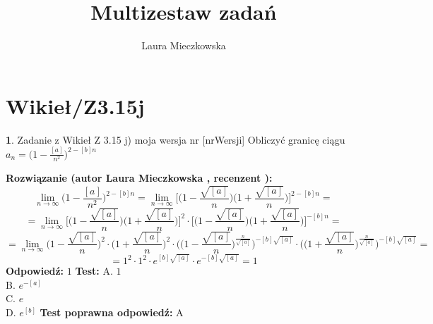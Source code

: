 \documentclass[12pt, a4paper]{article}
\title{Multizestaw zadań}
\author{Laura Mieczkowska}
\date{}
\theoremstyle{definition} %
\newtheorem{zad}{}
\newcommand{\kategoria}[1]{\section{#1}} %
\newcommand{\zadStart}[1]{\begin{zad}#1\newline} %
\newcommand{\zadStop}{\end{zad}}   %
\newcommand{\rozwStart}[2]{\noindent \textbf{Rozwiązanie (autor #1 , recenzent #2): }\newline} %
\newcommand{\odpStart}{\noindent \textbf{Odpowiedź:}\newline}    %
\newcommand{\odpStop}{\newline}                                             %
\newcommand{\testStart}{\noindent \textbf{Test:}\newline} %
\newcommand{\testStop}{\newline} %
\newcommand{\kluczStart}{\noindent \textbf{Test poprawna odpowiedź:}\newline} %
\newcommand{\kluczStop}{\newline} %
\begin{document}
\maketitle


\kategoria{Wikieł/Z3.15j}
\zadStart{Zadanie z Wikieł Z 3.15 j) moja wersja nr [nrWersji]}
Obliczyć granicę ciągu $a_n=\big(1-\frac{[a]}{n^2}\big)^{2-[b]n}$
\zadStop
\rozwStart{Laura Mieczkowska}{}
$$\lim_{n\to\infty} \bigg(1-\frac{[a]}{n^2}\bigg)^{2-[b]n}=
\lim_{n\to\infty} \bigg[\bigg(1-\frac{\sqrt{[a]}}{n}\bigg)\bigg(1+\frac{\sqrt{[a]}}{n}\bigg)\bigg]^{2-[b]n}=$$
$$=\lim_{n\to\infty}\bigg[\bigg(1-\frac{\sqrt{[a]}}{n}\bigg)\bigg(1+\frac{\sqrt{[a]}}{n}\bigg)\bigg]^2 \cdot \bigg[\bigg(1-\frac{\sqrt{[a]}}{n}\bigg)\bigg(1+\frac{\sqrt{[a]}}{n}\bigg)\bigg]^{-[b]n}=$$
$$=\lim_{n\to\infty}\bigg(1-\frac{\sqrt{[a]}}{n}\bigg)^2\cdot\bigg(1+\frac{\sqrt{[a]}}{n}\bigg)^2 \cdot \bigg(\bigg(1-\frac{\sqrt{[a]}}{n}\bigg)^{\frac{n}{\sqrt{[a]}}}\bigg)^{-[b]\sqrt{[a]}}\cdot\bigg(\bigg(1+\frac{\sqrt{[a]}}{n}\bigg)^{\frac{n}{\sqrt{[a]}}}\bigg)^{-[b]\sqrt{[a]}}=$$
$$=1^2\cdot 1^2\cdot e^{[b]\sqrt{[a]}} \cdot e^{-[b]\sqrt{[a]}}=1 $$
\odpStart
$1$
\odpStop
\testStart
A. $1$ \\
B. $e^{-[a]}$ \\
C. $e$ \\
D. $e^{[b]}$ 
\testStop
\kluczStart
A
\kluczStop
\end{document}
